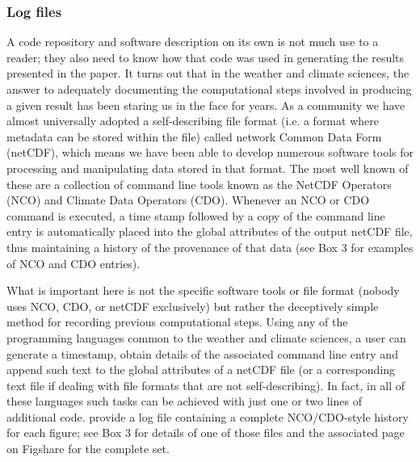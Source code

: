 \subsubsection{Log files}\label{s:log_files}

A code repository and software description on its own is not much use to a reader; they also need to know how that code was used in generating the results presented in the paper. It turns out that in the weather and climate sciences, the answer to adequately documenting the computational steps involved in producing a given result has been staring us in the face for years. As a community we have almost universally adopted a self-describing file format (i.e. a format where metadata can be stored within the file) called network Common Data Form (netCDF), which means we have been able to develop numerous software tools for processing and manipulating data stored in that format. The most well known of these are a collection of command line tools known as the NetCDF Operators (NCO) and Climate Data Operators (CDO). Whenever an NCO or CDO command is executed, a time stamp followed by a copy of the command line entry is automatically placed into the global attributes of the output netCDF file, thus maintaining a history of the provenance of that data (see Box 3 for examples of NCO and CDO entries).

What is important here is not the specific software tools or file format (nobody uses NCO, CDO, or netCDF exclusively) but rather the deceptively simple method for recording previous computational steps. Using any of the programming languages common to the weather and climate sciences, a user can generate a timestamp, obtain details of the associated command line entry and append such text to the global attributes of a netCDF file (or a corresponding text file if dealing with file formats that are not self-describing). In fact, in all of these languages such tasks can be achieved with just one or two lines of additional code. \citet{Irving2016} provide a log file containing a complete NCO/CDO-style history for each figure; see Box 3 for details of one of those files and the associated page on Figshare \citep{Irving2015} for the complete set.

